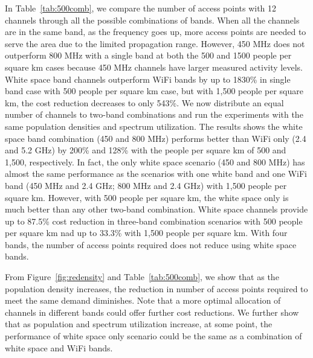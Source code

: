 In Table~\ref{tab:500comb}, we compare the number of access points with 12 channels through all 
the possible combinations of bands. 
When all the channels are in the same band, as the frequency goes up, more access 
points are needed to serve the area due to the limited propagation range. However,
450 MHz does not outperform 800 MHz with a single band at both the 500 and 1500 people per
square km cases because 450 MHz channels have larger measured activity levels. 
White space band channels outperform WiFi bands by up to 1830\% in single band case
with 500 people per square km case, but with 1,500 people per square km, the cost reduction
decreases to only 543\%.
We now distribute an equal number of channels to two-band combinations and run the experiments 
with the same population densities and spectrum utilization. The results shows the white space band
combination (450 and 800 MHz) performs better than WiFi only (2.4 and 5.2 GHz) by 200\% and
128\% with the people per square km of 500 and 1,500, respectively. In fact, the only white space 
scenario (450 and 800 MHz) has almost the same performance as the scenarios with one white band and
one WiFi band (450 MHz and 2.4 GHz; 800 MHz and 2.4 GHz) with 1,500 people per square km.
However, with 500 people per square km, the white space only is much better than any other two-band combination.
White space channels provide up to 87.5\% cost reduction in three-band combination scenarios with
500 people per square km nad up to 33.3\% with 1,500 people per square km.  With four bands,
the number of access points required does not reduce using white space bands.

From Figure~\ref{fig:redensity} and Table~\ref{tab:500comb}, we show that as the population
density increases, the reduction in number of access points required to meet the same demand 
diminishes. Note that a more optimal allocation of channels in different bands could offer
further cost reductions. We further show that as population and spectrum utilization increase, 
at some point, the performance of white space only scenario could be the same as a combination of
white space and WiFi bands. 

